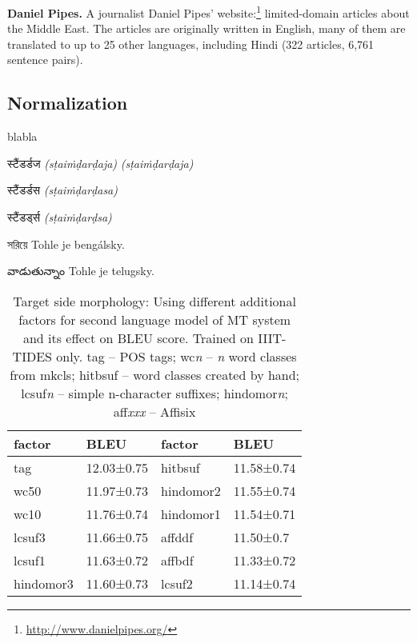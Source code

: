 \documentclass[11pt]{article}
\newcommand{\hi}[1]{{\hifont #1}}
\newcommand{\bn}[1]{{\bnfont #1}}
\newcommand{\te}[1]{{\tefont #1}}
\newcommand{\translit}[1]{{\translitfont \textit{#1}}}
\def\microsection#1{{\bf #1.}}
\begin{document}
\microsection{Daniel Pipes}
\label{sec:dpipes}
A journalist Daniel Pipes' website:\footnote{\url{http://www.danielpipes.org/}} limited-domain articles about the Middle East. 
The articles are originally written in English, many of them are translated to
up to 25 other languages, including Hindi (322 articles, 6,761 sentence
pairs).

\subsection{Normalization}

blabla

\begin{compactitem}
\item \hi{स्टैंडर्डज} \textit{(sṭaiṁḍarḍaja)} \translit{(sṭaiṁḍarḍaja)}
\item \hi{स्टैंडर्डस} \textit{(sṭaiṁḍarḍasa)}
\item \hi{स्टैंडर्ड्स} \textit{(sṭaiṁḍarḍsa)}
\item \bn{সরিয়ে} Tohle je bengálsky.
\item \te{వాడుతున్నాం} Tohle je telugsky.
\end{compactitem}

\begin{table}[t]
\begin{center}
\small
\begin{tabular}{l  l | ll}
factor & BLEU &
factor & BLEU\\
\hline
tag & 12.03±0.75 &	hitbsuf & 11.58±0.74\\
wc50 & 11.97±0.73 &	hindomor2 & 11.55±0.74\\
wc10 & 11.76±0.74 &	hindomor1 & 11.54±0.71\\
lcsuf3 & 11.66±0.75 &	affddf & 11.50±0.7\\
lcsuf1 & 11.63±0.72 &	affbdf & 11.33±0.72\\
hindomor3 & 11.60±0.73 &	lcsuf2 & 11.14±0.74\\
\end{tabular}
\end{center}
\caption{Target side morphology: Using different additional factors for second
language model of MT system and its  effect on BLEU score. Trained on
IIIT-TIDES only. 
tag -- POS tags; wc\textit{n} -- \textit{n} word classes from mkcls; hitbsuf --
word classes created by hand; lcsuf\textit{n} -- simple
n-character suffixes; hindomor\textit{n};
aff\textit{xxx} -- Affisix
} 
\label{tab:morph}
\end{table}
\end{document}
